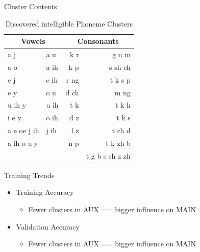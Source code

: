 \documentclass[final]{beamer} %
\begin{document}
\begin{frame}
\begin{columns}
\begin{column}{0.23\textwidth}
{\begin{block}{\boxnumber Cluster Contents}
        \end{block}

        \vfill
        
          \begin{table}[!htbp]
            \centering
            \caption{Discovered intelligible Phoneme Clusters}
            \label{tab:results}
            \begin{adjustbox}{width=.5\textwidth}
              \begin{tabular}{llrr}
                \toprule
                \multicolumn{2}{c}{Vowels} &  \multicolumn{2}{c}{ Consonants} \\
                \midrule
                a  j & a  u  &   k  r &     g n m \\
                a  o & a  ih  &    k p  &    s sh ch\\
                e  j & e  ih & r ng & t k s p \\
                e  y &o  u & d ch & m ng\\
                u  ih  y   & u  ih & t k & t k h\\
                i  e  y &o  ih & d z&t k s \\
                a  e  oe  j ih & j ih & l z  & t ch d\\
                a  ih  o  u  y &  &  n p & t k zh b  \\
                &&& t g b s sh z zh \\
                \bottomrule
              \end{tabular}
            \end{adjustbox}
          \end{table}

          \vfill


          \begin{block}{\boxnumber Training Trends}
                    
            \begin{itemize}
            \item Training Accuracy
              \begin{itemize}
              \item Fewer clusters in AUX == bigger influence on MAIN
              \end{itemize}
            \item Validation Accuracy
              \begin{itemize}
              \item Fewer clusters in AUX == bigger influence on MAIN
                \end{itemize}
          \end{itemize}
          

\end{block}}
\end{column}
\end{columns}
\end{frame}
\end{document}
